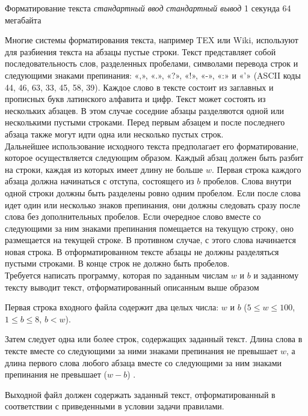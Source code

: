 \begin{problem}%
{Форматирование текста}%
{\textsl{стандартный ввод}}%
{\textsl{стандартный вывод}}%
{1 секунда}%
{64 мегабайта}{}

Многие системы форматирования текста, например TEX или Wiki, используют для разбиения текста на абзацы пустые строки. Текст представляет собой последовательность слов, разделенных пробелами, символами перевода строк и следующими знаками препинания: «,», «.», «?», «!», «-», «:» и «’» (ASCII коды 44, 46, 63, 33, 45, 58, 39). Каждое слово в тексте состоит из заглавных и прописных букв латинского алфавита и цифр. Текст может состоять из нескольких абзацев. В этом случае соседние абзацы разделяются одной или несколькими пустыми строками. Перед первым абзацем и после последнего абзаца также могут идти одна или несколько пустых строк.\\

Дальнейшее использование исходного текста предполагает его форматирование, которое осуществляется следующим образом. Каждый абзац должен быть разбит на строки, каждая из которых имеет длину не больше $w$. Первая строка каждого абзаца должна начинаться с отступа, состоящего из $b$ пробелов. Слова внутри одной строки должны быть разделены ровно одним пробелом. Если после слова идет один или несколько знаков препинания, они должны следовать сразу после слова без дополнительных пробелов. Если очередное слово вместе со следующими за ним знаками препинания помещается на текущую строку, оно размещается на текущей строке. В противном случае, с этого слова начинается новая строка. В отформатированном тексте абзацы не должны разделяться пустыми строками. В конце строк не должно быть пробелов.\\

Требуется написать программу, которая по заданным числам $w$ и $b$ и заданному тексту выводит текст, отформатированный описанным выше образом

\InputFile

Первая строка входного файла содержит два целых числа: $w$ и $b$ ($5 \le w \le 100$, $1 \le b \le 8$, $b < w$).

Затем следует одна или более строк, содержащих заданный текст. Длина слова в тексте вместе со следующими за ними знаками препинания не превышает $w$, а длина первого слова любого абзаца вместе со следующими за ним знаками препинания не превышает ($w - b$) .

\OutputFile

Выходной файл должен содержать заданный текст, отформатированный в соответствии с приведенными в условии задачи правилами.


\end{problem}
